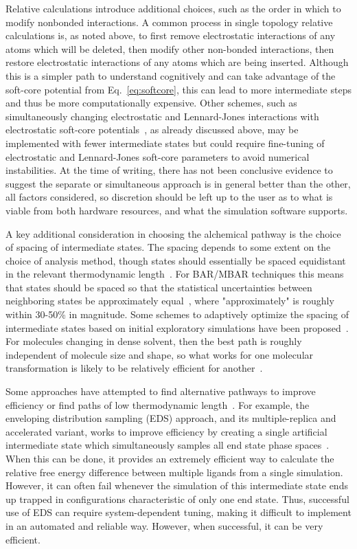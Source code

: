 \documentclass[9pt,bestpractices,pubversion]{livecoms}
\begin{document}
Relative calculations introduce additional choices, such as the order in which to modify nonbonded interactions.
A common process in single topology relative calculations is, as noted above, to first remove electrostatic interactions of any atoms which will be deleted, then modify other non-bonded interactions, then restore electrostatic interactions of any atoms which are being inserted. Although this is a simpler path to understand cognitively and can take advantage of the soft-core potential from Eq.~\ref{eq:softcore}, this can lead to more intermediate steps and thus be more computationally expensive.
Other schemes, such as simultaneously changing electrostatic and Lennard-Jones interactions with electrostatic soft-core potentials~\cite{steinbrecher2007nonlinear}, as already discussed above, may be implemented with fewer intermediate states but could require fine-tuning of electrostatic and Lennard-Jones soft-core parameters to avoid numerical instabilities. 
At the time of writing, there has not been conclusive evidence to suggest the separate or simultaneous approach is in general better than the other, all factors considered, so discretion should be left up to the user as to what is viable from both hardware resources, and what the simulation software supports.

A key additional consideration in choosing the alchemical pathway is the choice of spacing of intermediate states.
The spacing depends to some extent on the choice of analysis method, though states should essentially be spaced equidistant in the relevant thermodynamic length~\cite{crooks2007measuring, sivak2012thermodynamic}.
For BAR/MBAR techniques this means that states should be spaced so that the statistical uncertainties between neighboring states be approximately equal~\cite{pham2012optimal, shenfeld2009minimizing}, where "approximately" is roughly within 30-50\% in magnitude. 
Some schemes to adaptively optimize the spacing of intermediate states based on initial exploratory simulations have been proposed~\cite{hayes2017adaptive}. For molecules changing in dense solvent, then the best path is roughly independent of molecule size and shape, so what works for one molecular transformation is likely to be relatively efficient for another~\cite{monroe2014converging}.


Some approaches have attempted to find alternative pathways to improve efficiency or find paths of low thermodynamic length~\cite{naden2014linear,naden2015linear,pham2012optimal}. For example, the enveloping distribution sampling (EDS) approach, and its multiple-replica and accelerated variant, works to improve efficiency by creating a single artificial intermediate state which simultaneously samples all end state phase spaces~\cite{perthold2018accelerated,sidler2017efficient, christ2007enveloping}. When this can be done, it provides an extremely efficient way to calculate the relative free energy difference between multiple ligands from a single simulation. However, it can often fail whenever the simulation of this intermediate state ends up trapped in configurations characteristic of only one end state. Thus, successful use of EDS can require system-dependent tuning, making it difficult to implement in an automated and reliable way. However, when successful, it can be very efficient.
\end{document}
